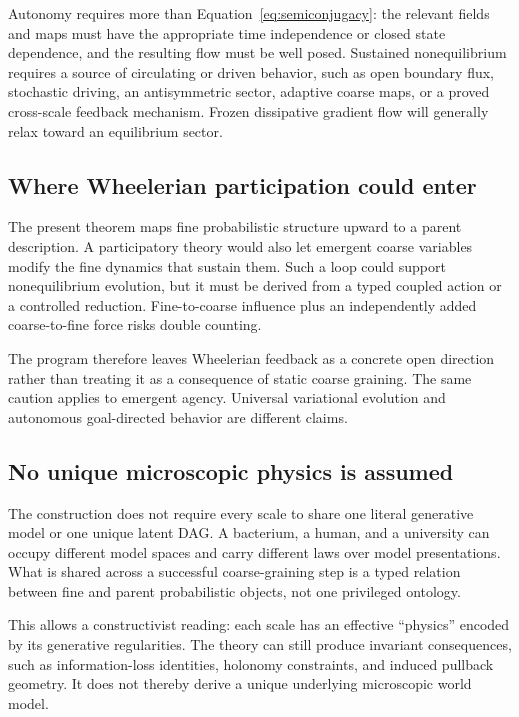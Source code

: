 \documentclass[11pt,letterpaper]{article}
\begin{document}
Autonomy requires more than Equation~\eqref{eq:semiconjugacy}: the relevant fields and maps must have the appropriate time independence or closed state dependence, and the resulting flow must be well posed. Sustained nonequilibrium requires a source of circulating or driven behavior, such as open boundary flux, stochastic driving, an antisymmetric sector, adaptive coarse maps, or a proved cross-scale feedback mechanism. Frozen dissipative gradient flow will generally relax toward an equilibrium sector.

\subsection{Where Wheelerian participation could enter}

The present theorem maps fine probabilistic structure upward to a parent description. A participatory theory would also let emergent coarse variables modify the fine dynamics that sustain them. Such a loop could support nonequilibrium evolution, but it must be derived from a typed coupled action or a controlled reduction. Fine-to-coarse influence plus an independently added coarse-to-fine force risks double counting.

The program therefore leaves Wheelerian feedback as a concrete open direction rather than treating it as a consequence of static coarse graining. The same caution applies to emergent agency. Universal variational evolution and autonomous goal-directed behavior are different claims.

\subsection{No unique microscopic physics is assumed}

The construction does not require every scale to share one literal generative model or one unique latent DAG. A bacterium, a human, and a university can occupy different model spaces and carry different laws over model presentations. What is shared across a successful coarse-graining step is a typed relation between fine and parent probabilistic objects, not one privileged ontology.

This allows a constructivist reading: each scale has an effective ``physics'' encoded by its generative regularities. The theory can still produce invariant consequences, such as information-loss identities, holonomy constraints, and induced pullback geometry. It does not thereby derive a unique underlying microscopic world model.
\end{document}
